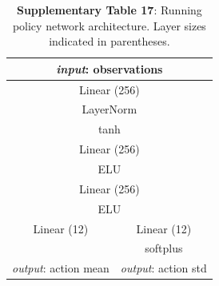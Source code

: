\documentclass[sn-mathphys-num]{sn-jnl}%
\theoremstyle{thmstyleone}	%
\theoremstyle{thmstyletwo}	%
\theoremstyle{thmstylethree}	%
\begin{document}
\begin{appendices}
\begin{table}[htbp]
	\centering
	\small
	\caption{\textbf{Supplementary Table 17}:
		Running policy network architecture. 
		Layer sizes indicated in parentheses.
	}
	\begin{tabular}{cc}
		\toprule
		\multicolumn{2}{c}{\textit{input}: observations}             \\
		\midrule
		\multicolumn{2}{c}{Linear (256)}        \\
		\multicolumn{2}{c}{LayerNorm}      \\
		\multicolumn{2}{c}{tanh}     \\
		\multicolumn{2}{c}{Linear (256)}      \\
		\multicolumn{2}{c}{ELU}       \\
		\multicolumn{2}{c}{Linear (256)}       \\
		\multicolumn{2}{c}{ELU}      \\
		\midrule
		Linear (12)     &  Linear (12)  \\
		     &  softplus \\
		\textit{output}: action mean     &  \textit{output}: action std  \\
		\bottomrule
	\end{tabular}%
	\label{tab:s_17}%
\end{table}%






\end{appendices}
\end{document}
